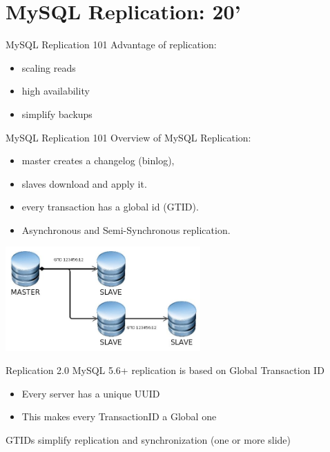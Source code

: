 \documentclass{beamer}[10]
\begin{document}
%
%
\section{MySQL Replication: 20'}
\begin{pyframe}{MySQL Replication 101}
Advantage of replication:
\begin{itemize}
  \item scaling reads
  \item high availability
  \item simplify backups
\end{itemize}
\end{pyframe}


\begin{pyframe}{MySQL Replication 101}
Overview of MySQL Replication:
\begin{itemize}
\item master creates a changelog (binlog),
\item slaves download and apply it.
\item every transaction has a global id (GTID).
\item Asynchronous and Semi-Synchronous replication.
\end{itemize}
\includegraphics[height=4cm]{images/mysql-propagate-gtid.jpg}
\end{pyframe}


\iffalse
\begin{pyframe}{Replication 2.0}
MySQL 5.6+ replication is based on Global Transaction ID
\begin{itemize}
\item Every server has a unique UUID \\

\item This makes every TransactionID a Global one
\end{itemize}
GTIDs simplify replication and synchronization (one or more slide)
\end{pyframe}
\end{document}
